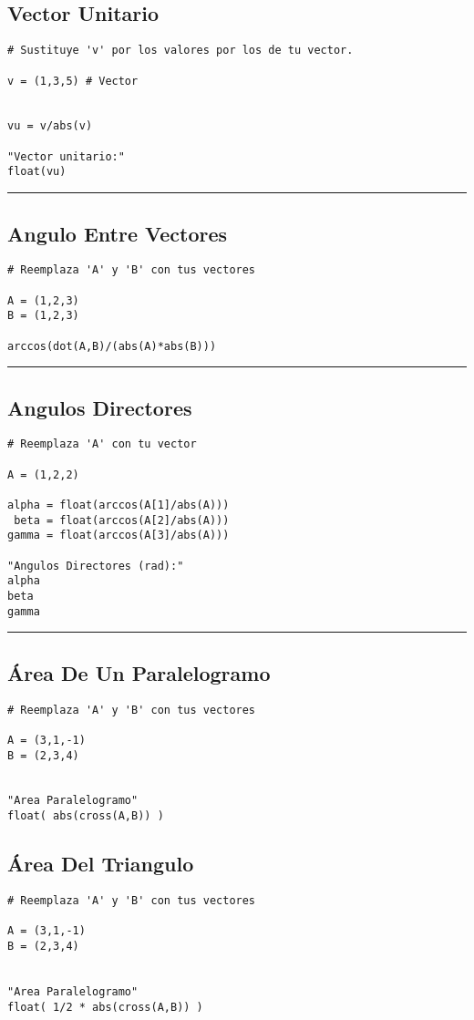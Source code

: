 \documentclass{article}
\begin{document}
\subsection{Vector Unitario}
\label{sec:org185d493}
\begin{verbatim}
# Sustituye 'v' por los valores por los de tu vector.

v = (1,3,5) # Vector


vu = v/abs(v)

"Vector unitario:"
float(vu)
\end{verbatim}

\noindent\rule{\textwidth}{0.5pt}

\subsection{Angulo Entre Vectores}
\label{sec:orgb2a6f91}
\begin{verbatim}
# Reemplaza 'A' y 'B' con tus vectores

A = (1,2,3)
B = (1,2,3)

arccos(dot(A,B)/(abs(A)*abs(B)))
\end{verbatim}

\noindent\rule{\textwidth}{0.5pt}

\subsection{Angulos Directores}
\label{sec:org920c8ef}
\begin{verbatim}
# Reemplaza 'A' con tu vector

A = (1,2,2)

alpha = float(arccos(A[1]/abs(A)))
 beta = float(arccos(A[2]/abs(A)))
gamma = float(arccos(A[3]/abs(A)))

"Angulos Directores (rad):"
alpha
beta
gamma
\end{verbatim}

\noindent\rule{\textwidth}{0.5pt}
\subsection{Área De Un Paralelogramo}
\label{sec:orga67109e}
\begin{verbatim}
# Reemplaza 'A' y 'B' con tus vectores

A = (3,1,-1)
B = (2,3,4)


"Area Paralelogramo"
float( abs(cross(A,B)) )
\end{verbatim}

\subsection{Área Del Triangulo}
\label{sec:org7c0e8ef}
\begin{verbatim}
# Reemplaza 'A' y 'B' con tus vectores

A = (3,1,-1)
B = (2,3,4)


"Area Paralelogramo"
float( 1/2 * abs(cross(A,B)) )
\end{verbatim}
\end{document}
